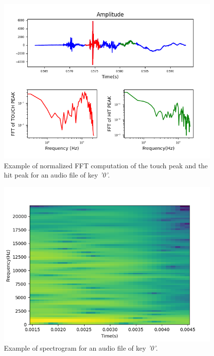\begin{figure}[H]
     \centering
     \includegraphics[width=.9\linewidth]{Images/AcCAPPCHA/feature_example}
     \caption{\footnotesize{Example of normalized FFT computation of the touch peak and the hit peak for an audio file of key \textit{'0'}.}}\label{AcCAPPCHA:feature_example}
\end{figure}
\begin{figure}[H]
     \centering
     \includegraphics[width=.8\linewidth]{Images/AcCAPPCHA/spectrogram}
     \caption{\footnotesize{Example of spectrogram for an audio file of key \textit{'0'}.}}\label{AcCAPPCHA:spectrogram}
\end{figure}
\clearpage

